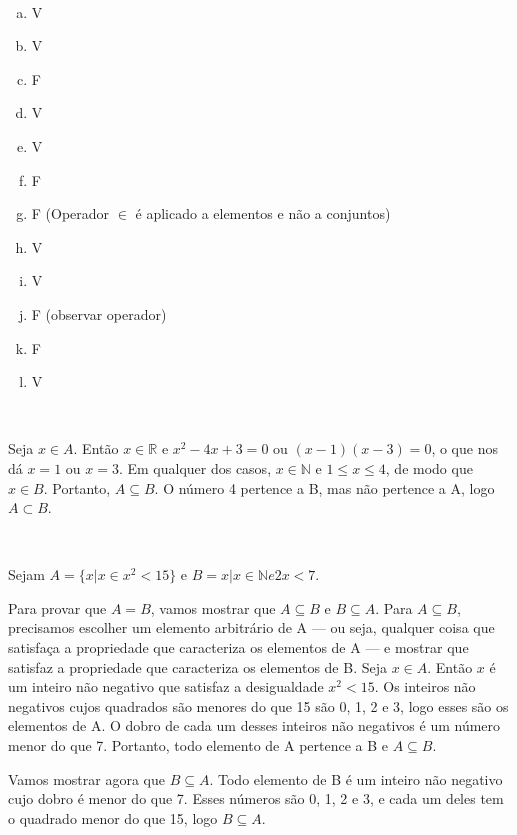 \begin{Gabarito}{4}
~

    \begin{multicols}{4}
        \begin{enumerate}[a)]
            \item V
            \item V
            \item F
            \item V
            \item V
            \item F
            \item F (Operador $\in$ é aplicado a elementos e não a conjuntos)
            \item V
            \item V
            \item F (observar operador)
            \item F
            \item V
        \end{enumerate}
      \end{multicols}
\end{Gabarito}
\begin{Gabarito}{5}
~

    Seja $x \in A$. Então $x \in \mathbb{R}$ e $x^2 - 4x + 3 = 0$ ou $(x - 1)(x - 3) = 0$, o que nos dá $x = 1$ ou $x = 3$. Em qualquer dos casos, $x \in \mathbb{N}$ e $1 \leq x \leq 4$, de modo que $x \in B$. Portanto, $A \subseteq B$. O número 4 pertence a B, mas não pertence a A, logo $A \subset B$.
\end{Gabarito}
\begin{Gabarito}{6}
~

    Sejam $A = \{x | x \in x^2 < 15\}$ e $B = {x | x \in \mathbb{N} e 2x < 7}$.

    Para provar que $A = B$, vamos mostrar que $A \subseteq B$ e $B \subseteq A$. Para $A \subseteq B$, precisamos escolher um elemento arbitrário de A — ou seja, qualquer coisa que satisfaça a propriedade que caracteriza os elementos de A — e mostrar que satisfaz a propriedade que caracteriza os elementos de B. Seja $x \in A$. Então $x$ é um inteiro não negativo que satisfaz a desigualdade $x^2 < 15$. Os inteiros não negativos cujos quadrados são menores do que 15 são 0, 1, 2 e 3, logo esses são os elementos de A. O dobro de cada um desses inteiros não negativos é um número menor do que 7. Portanto, todo elemento de A pertence a B e $A \subseteq B$.

    Vamos mostrar agora que $B \subseteq A$. Todo elemento de B é um inteiro não negativo cujo dobro é menor do que 7. Esses números são 0, 1, 2 e 3, e cada um deles tem o quadrado menor do que 15, logo $B \subseteq A$.
\end{Gabarito}
